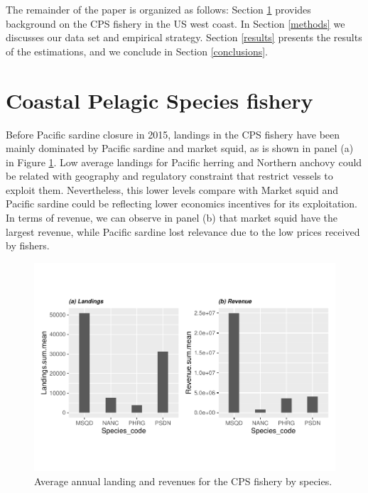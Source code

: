 \documentclass[
]{article}
\begin{document}
The remainder of the paper is organized as follows: Section
\ref{coastal-pelagic-species-fishery} provides background on the CPS
fishery in the US west coast. In Section \ref{methods} we discusses our
data set and empirical strategy. Section \ref{results} presents the
results of the estimations, and we conclude in Section
\ref{conclusions}.

\hypertarget{coastal-pelagic-species-fishery}{%
\section{Coastal Pelagic Species
fishery}\label{coastal-pelagic-species-fishery}}

Before Pacific sardine closure in 2015, landings in the CPS fishery have
been mainly dominated by Pacific sardine and market squid, as is shown
in panel (a) in Figure \ref{fig:avg_lan_rev}. Low average landings for
Pacific herring and Northern anchovy could be related with geography and
regulatory constraint that restrict vessels to exploit them.
Nevertheless, this lower levels compare with Market squid and Pacific
sardine could be reflecting lower economics incentives for its
exploitation. In terms of revenue, we can observe in panel (b) that
market squid have the largest revenue, while Pacific sardine lost
relevance due to the low prices received by fishers.

\begin{figure}
\centering
\includegraphics{econ_landings_paper_files/figure-latex/avg_landings-1.pdf}
\caption{Average annual landing and revenues for the CPS fishery by
species.\label{fig:avg_lan_rev}}
\end{figure}
\end{document}
